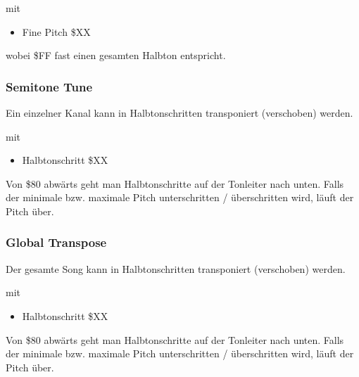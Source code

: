 \medskip

mit

\begin{itemize}
	\item Fine Pitch \$XX
\end{itemize}

wobei \$FF fast einen gesamten Halbton entspricht.

\subsubsection{Semitone Tune}

Ein einzelner Kanal kann in Halbtonschritten transponiert (verschoben) werden.

\medskip



\medskip

mit

\begin{itemize}
	\item Halbtonschritt \$XX
\end{itemize}

Von \$80 abwärts geht man Halbtonschritte auf der Tonleiter nach unten. Falls der minimale bzw. maximale Pitch unterschritten / überschritten wird, läuft der Pitch über.

\subsubsection{Global Transpose}

Der gesamte Song kann in Halbtonschritten transponiert (verschoben) werden.

\medskip



\medskip

mit

\begin{itemize}
	\item Halbtonschritt \$XX
\end{itemize}

Von \$80 abwärts geht man Halbtonschritte auf der Tonleiter nach unten. Falls der minimale bzw. maximale Pitch unterschritten / überschritten wird, läuft der Pitch über.